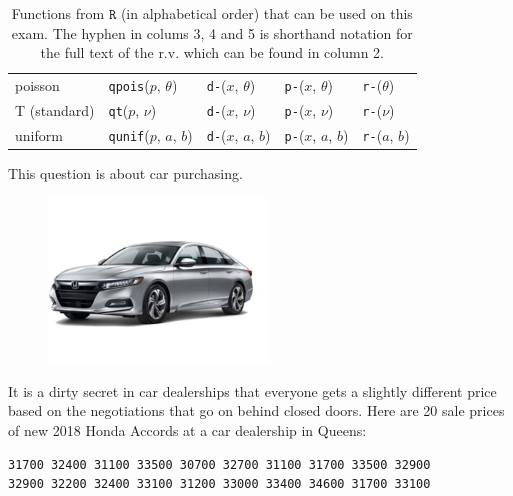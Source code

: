 \documentclass[12pt]{article}
\begin{document}
\begin{table}[htp]
\begin{tabular}{l | llll}

poisson & \texttt{qpois}($p$, $\theta$) 
& \texttt{d-}($x$, $\theta$)
& \texttt{p-}($x$, $\theta$) 
& \texttt{r-}($\theta$) \\

T (standard) & \texttt{qt}($p$, $\nu$) 
& \texttt{d-}($x$, $\nu$) 
& \texttt{p-}($x$, $\nu$)
& \texttt{r-}($\nu$) \\


uniform & \texttt{qunif}($p$, $a$, $b$) 
& \texttt{d-}($x$, $a$, $b$)
& \texttt{p-}($x$, $a$, $b$) 
& \texttt{r-}($a$, $b$) \\


\end{tabular}
\caption{Functions from $\texttt{R}$ (in alphabetical order) that can be used on this exam. The hyphen in colums 3, 4 and 5 is shorthand notation for the full text of the r.v. which can be found in column 2.
}
\label{tab:eqs}
\end{table}






\problem This question is about car purchasing.

\begin{figure}[htp]
\centering
\includegraphics[width=2.3in]{accord.jpg}
\end{figure}

It is a dirty secret in car dealerships that everyone gets a slightly different price based on the negotiations that go on behind closed doors. Here are 20 sale prices of new 2018 Honda Accords at a car dealership in Queens:

\begin{verbatim}
31700 32400 31100 33500 30700 32700 31100 31700 33500 32900
32900 32200 32400 33100 31200 33000 33400 34600 31700 33100 
\end{verbatim}
\end{document}
